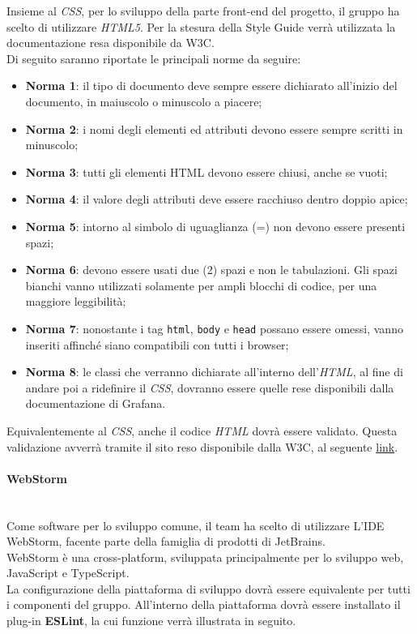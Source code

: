 Insieme al \textit{CSS}, per lo sviluppo della parte front-end del progetto, il gruppo ha scelto di utilizzare \textit{HTML5}. Per la stesura della Style Guide verrà utilizzata la documentazione resa disponibile da W3C.\\
Di seguito saranno riportate le principali norme da seguire: 
\begin{itemize}
	\item \textbf{Norma 1}: 
		il tipo di documento deve sempre essere dichiarato all'inizio del documento, in maiuscolo o minuscolo a piacere;
	\item \textbf{Norma 2}: 
		i nomi degli elementi ed attributi devono essere sempre scritti in minuscolo;
	\item \textbf{Norma 3}:
		tutti gli elementi HTML devono essere chiusi, anche se vuoti;
	\item \textbf{Norma 4}:
		il valore degli attributi deve essere racchiuso dentro doppio apice;
	\item \textbf{Norma 5}: 
		intorno al simbolo di uguaglianza (=) non devono essere presenti spazi;
	\item \textbf{Norma 6}:
		devono essere usati due (2) spazi e non le tabulazioni. Gli spazi bianchi vanno utilizzati solamente per ampli blocchi di codice, per una maggiore leggibilità;
	\item \textbf{Norma 7}:
		nonostante i tag \texttt{html}, 	\texttt{body} e \texttt{head} possano essere omessi, vanno inseriti affinché siano compatibili con tutti i browser;
	\item \textbf{Norma 8}:
		le classi che verranno dichiarate all'interno dell'\textit{HTML}, al fine di andare poi a ridefinire il \textit{CSS}, dovranno essere quelle rese disponibili dalla documentazione di Grafana.
\end{itemize}

Equivalentemente al \textit{CSS}, anche il codice \textit{HTML} dovrà essere validato. Questa validazione avverrà tramite il sito reso disponibile dalla W3C, al seguente \href{https://validator.w3.org/}{link}.


\paragraph{WebStorm}\-\\
Come software per lo sviluppo comune, il team ha scelto di utilizzare L'IDE WebStorm, facente parte della famiglia di prodotti di JetBrains. \\
WebStorm è una cross-platform, sviluppata principalmente per lo sviluppo web, JavaScript e TypeScript. \\
La configurazione della piattaforma di sviluppo dovrà essere equivalente per tutti i componenti del gruppo. All'interno della piattaforma dovrà essere installato il plug-in \textbf{ESLint}, la cui funzione verrà illustrata in seguito.

